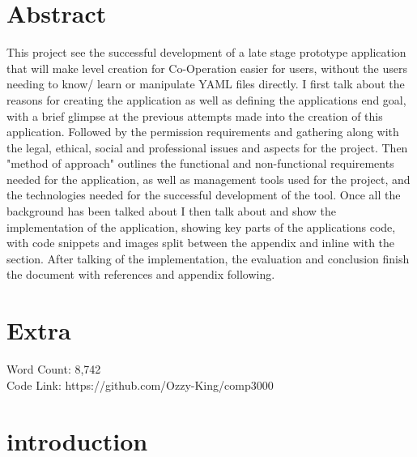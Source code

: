 \section*{Abstract}
This project see the successful development of a late stage prototype application that will make level creation for Co-Operation easier for users, without the users needing to know/ learn or manipulate YAML files directly. I first talk about the reasons for creating the application as well as defining the applications end goal, with a brief glimpse at the previous attempts made into the creation of this application. Followed by the permission requirements and gathering along with the legal, ethical, social and professional issues and aspects for the project. Then "method of approach" outlines the functional and non-functional requirements needed for the application, as well as management tools used for the project, and the technologies needed for the successful development of the tool. Once all the background has been talked about I then talk about and show the implementation of the application, showing key parts of the applications code, with code snippets and images split between the appendix and inline with the section. After talking of the implementation, the evaluation and conclusion finish the document with references and appendix following.

\section*{Extra}
Word Count: 8,742\\
Code Link: https://github.com/Ozzy-King/comp3000

\clearpage
{}
\tableofcontents
\clearpage
{}
\listoffigures
{}
\lstlistoflistings
\clearpage


\section{introduction}
